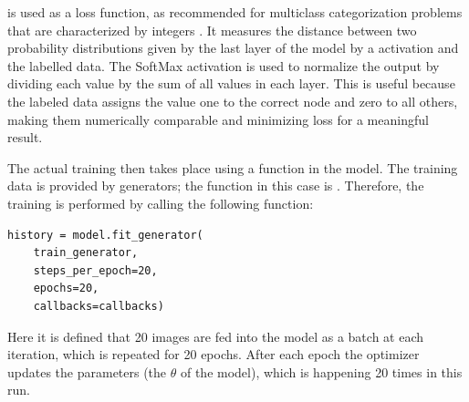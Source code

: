  is used as a loss function, as recommended for multiclass categorization problems that are characterized by integers \cite[p.84]{Chollet2017}.
It measures the distance between two probability distributions given by the last layer of the model by a  activation and the labelled data.
The SoftMax activation is used to normalize the output by dividing each value by the sum of all values in each layer.
This is useful because the labeled data assigns the value one to the correct node and zero to all others, making them numerically comparable and minimizing loss for a meaningful result.

The actual training then takes place using a  function in the model.
The training data is provided by generators; the function in this case is .
Therefore, the training is performed by calling the following function:

\begin{lstlisting}
history = model.fit_generator(
    train_generator,
    steps_per_epoch=20,
    epochs=20,
    callbacks=callbacks)
\end{lstlisting}

Here it is defined that 20 images are fed into the model as a batch at each iteration, which is repeated for 20 epochs.
After each epoch the optimizer updates the parameters (the $\theta$ of the model), which is happening 20 times in this run.

